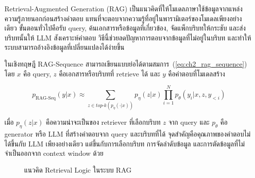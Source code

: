 Retrieval-Augmented Generation (RAG) เป็นแนวคิดที่ให้โมเดลภาษาใช้ข้อมูลจากแหล่งความรู้ภายนอกก่อนสร้างคำตอบ แทนที่จะตอบจากความรู้ที่อยู่ในพารามิเตอร์ของโมเดลเพียงอย่างเดียว ขั้นตอนทั่วไปคือรับ query, ค้นเอกสารหรือข้อมูลที่เกี่ยวข้อง, จัดแพ็กบริบทให้กระชับ และส่งบริบทนั้นให้ LLM สังเคราะห์คำตอบ วิธีนี้ช่วยลดปัญหาการตอบจากข้อมูลที่ไม่อยู่ในบริบท และทำให้ระบบสามารถอ้างอิงข้อมูลที่เปลี่ยนแปลงได้ง่ายขึ้น \cite{Lewis2020RAG}

ในเชิงทฤษฎี RAG-Sequence สามารถเขียนแบบย่อได้ตามสมการ~(\ref{eq:ch2_rag_sequence}) โดย $x$ คือ query, $z$ คือเอกสารหรือบริบทที่ retrieve ได้ และ $y$ คือคำตอบที่โมเดลสร้าง

\begin{equation}
    p_{\mathrm{RAG\text{-}Seq}}(y|x)
    \approx
    \sum_{z \in top\text{-}k(p_{\eta}(\cdot|x))}
    p_{\eta}(z|x)
    \prod_{i=1}^{N} p_{\theta}(y_i|x,z,y_{<i})
    \label{eq:ch2_rag_sequence}
\end{equation}

เมื่อ $p_{\eta}(z|x)$ คือความน่าจะเป็นของ retriever ที่เลือกบริบท $z$ จาก query และ $p_{\theta}$ คือ generator หรือ LLM ที่สร้างคำตอบจาก query และบริบทที่ได้ จุดสำคัญคือคุณภาพของคำตอบไม่ได้ขึ้นกับ LLM เพียงอย่างเดียว แต่ขึ้นกับการเลือกบริบท การจัดลำดับข้อมูล และการตัดข้อมูลที่ไม่จำเป็นออกจาก context window ด้วย

\begin{figure}[htbp]
    \centering
    \caption{แนวคิด Retrieval Logic ในระบบ RAG}
    \label{fig:ch2_rag_pipeline}
\end{figure}

